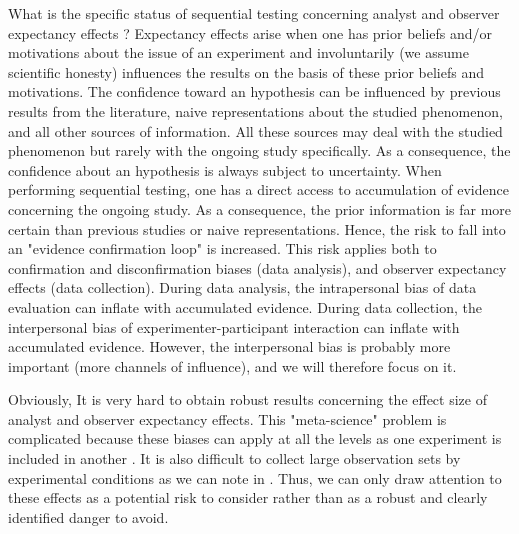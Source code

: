 \documentclass[a4paper,man,natbib,floatsintext,donotrepeattitle]{apa6}
\begin{document}
What is the specific status of sequential testing concerning analyst and observer expectancy effects ? Expectancy effects arise when one has prior beliefs and/or motivations about the issue of an experiment and involuntarily (we assume scientific honesty) influences the results on the basis of these prior beliefs and motivations. The confidence toward an hypothesis can be influenced by previous results from the literature, naive representations about the studied phenomenon, and all other sources of information. All these sources may deal with the studied phenomenon but rarely  with the ongoing study specifically. As a consequence, the confidence about an hypothesis is always subject to uncertainty. When performing sequential testing, one has a direct access to accumulation of evidence concerning the ongoing study. As a consequence, the prior information is far more certain than previous studies or naive representations. Hence, the risk to fall into an "evidence confirmation loop" is increased. This risk applies both to confirmation and disconfirmation biases (data analysis), and observer expectancy effects (data collection). During data analysis, the intrapersonal bias of data evaluation can inflate with accumulated evidence. During data collection, the interpersonal bias of experimenter-participant interaction can inflate with accumulated evidence. However, the interpersonal bias is probably more important (more channels of influence), and we will therefore focus on it. \par


Obviously, It is very hard to obtain robust results concerning the effect size of analyst and observer expectancy effects. This "meta-science" problem  is complicated because these biases can apply at all the levels as one experiment is included in another . It is also difficult to collect large observation sets by experimental conditions as we can note  in \cite{zoble_interaction_1969}. Thus, we can only draw attention to these effects as a potential risk to consider rather than as a robust and clearly identified danger to avoid. \par
\end{document}
